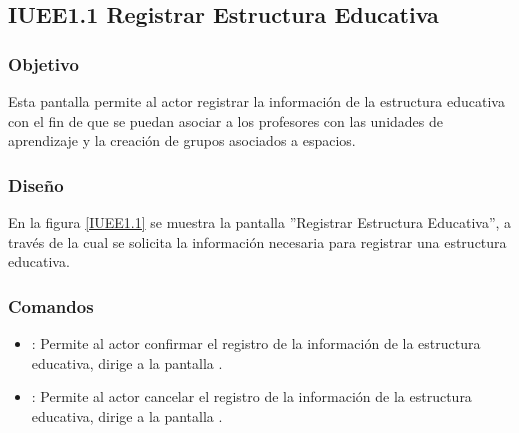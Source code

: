 \subsection{IUEE1.1 Registrar Estructura Educativa}

\subsubsection{Objetivo}
	Esta pantalla permite al actor registrar la información de la estructura educativa con el fin de que se puedan asociar a los profesores con las unidades de aprendizaje y la creación de grupos asociados a espacios.

\subsubsection{Diseño}

    En la figura \ref{IUEE1.1} se muestra la pantalla ''Registrar Estructura Educativa'', a través de la cual se solicita la información necesaria para registrar una estructura educativa.
 

\subsubsection{Comandos}
    \begin{itemize}
	\item {}: Permite al actor confirmar el registro de la información de la estructura educativa, dirige a la pantalla .
	
	\item {}: Permite al actor cancelar el registro de la información de la estructura educativa, dirige a la pantalla .
    \end{itemize}
